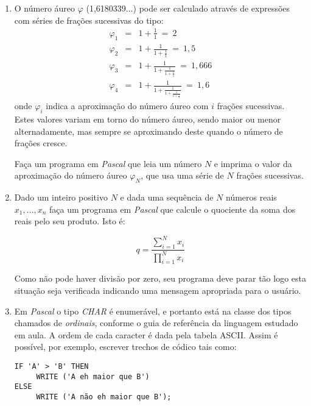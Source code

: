 \begin{enumerate}
\item O número áureo $\varphi$ (1,6180339...) pode ser calculado através de
expressões com séries de frações sucessivas do tipo:
\begin{eqnarray*}
   \varphi_1 &=& 1 + \frac{1}{1}\ =\ 2 \\
   \varphi_2 &=& 1 + \frac{1}{1 + \frac{1}{1}}\ =\ 1,5 \\
   \varphi_3 &=& 1 + \frac{1}{1 + \frac{1}{1 + \frac{1}{1}}}\ =\ 1,666 \\
   \varphi_4 &=& 1 + \frac{1}{1 + \frac{1}
                {1 + \frac{1}{1 + \frac{1}{1}}}}\ =\ 1,6
\end{eqnarray*}
onde $\varphi_i$ indica a aproximação do número áureo com $i$ frações
sucessivas. Estes valores variam em torno do número áureo, sendo maior ou
menor alternadamente, mas sempre se aproximando deste quando o número
de frações cresce.

Faça um programa em \emph{Pascal} que leia um número $N$ e imprima o
valor da aproximação do número áureo $\varphi_N$, que usa uma série de
$N$ frações sucessivas.

\item Dado um inteiro positivo $N$ e dada uma sequência de $N$ números reais $x_1, \ldots, x_n$
faça um programa em \emph{Pascal} que calcule o quociente da soma dos reais pelo seu produto. Isto é:

\[
q=\frac{\sum_{i=1}^{N}{x_i}}{\prod_{i=1}^{N}x_i}
\]

Como não pode haver divisão por zero, seu programa deve parar tão logo esta situação seja
verificada indicando uma mensagem apropriada para o usuário.

\item Em \emph{Pascal} o tipo \textit{CHAR} é enumerável, e portanto está na classe dos tipos
chamados de \textit{ordinais}, conforme o guia de referência da linguagem estudado em
aula. A ordem de cada caracter é dada pela tabela ASCII. Assim é possível, por exemplo, escrever
trechos de códico tais como:

\vspace*{\baselineskip}

\begin{center}
\begin{minipage}{8cm}
\begin{verbatim}
IF 'A' > 'B' THEN
     WRITE ('A eh maior que B')
ELSE
     WRITE ('A não eh maior que B');
\end{verbatim}
\end{minipage}
\end{center}


\end{enumerate}
